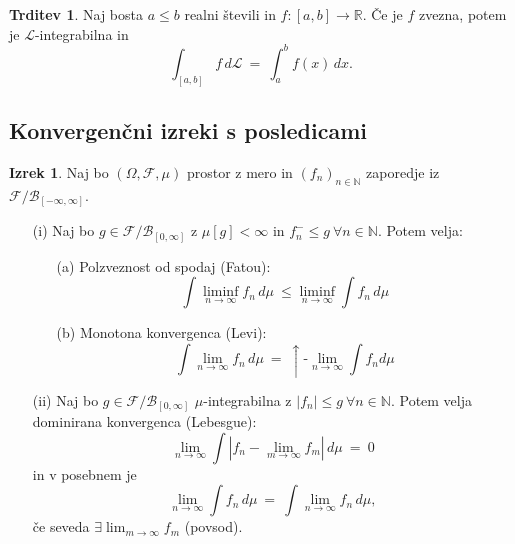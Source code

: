 \documentclass[11pt]{article}
\newcommand{\R}{\mathbb{R}}
\newcommand{\N}{\mathbb{N}}
\newcommand{\F}{\mathcal{F}}
\newcommand{\B}{\mathscr{B}}
\newcommand{\LL}{\mathscr{L}}
\newcommand{\1}{\mathbbm{1}}
\newcommand{\rr}{[-\infty,\infty]}
\theoremstyle{definition}
\theoremstyle{definition}
\newtheorem{trditev}{Trditev}[section]
\theoremstyle{definition}
\newtheorem{izrek}{Izrek}[section]
\theoremstyle{definition}
\begin{document}
\begin{trditev}

Naj bosta $a \leq b$ realni števili in $f: [a,b] \rightarrow \R$. Če je $f$ zvezna, potem je $\LL$-integrabilna in 
$$\int_{[a,b]} f \,d\LL ~=~ \int_a^b f(x)\,dx.$$

\end{trditev}
\vspace{0.5cm}


\subsection{Konvergenčni izreki s posledicami}
\vspace{0.5cm}

\begin{izrek}

Naj bo $(\Omega, \F,\mu)$ prostor z mero in $(f_n)_{n \in \N}$ zaporedje iz $\F/\B_{\rr}$.
\begin{itemize}

\item[(i)] Naj bo $g \in \F/\B_{[0,\infty]}$ z $\mu[g] < \infty$ in $f_n^- \leq g ~\forall n \in \N$. Potem velja:
\begin{itemize}
	\item[(a)] Polzveznost od spodaj (Fatou):
	$$\int \liminf_{n \rightarrow \infty} f_n \,d\mu ~\leq \liminf_{n \rightarrow \infty} \int f_n \,d\mu$$
	\item[(b)] Monotona konvergenca (Levi):
	$$\int \lim_{n \rightarrow \infty} f_n \,d\mu ~=~ \uparrow\text{-}\lim_{n \rightarrow \infty} \int f_n d\mu$$
\end{itemize}

\item[(ii)] Naj bo $g \in \F/\B_{[0,\infty]}$ $\mu$-integrabilna z $|f_n| \leq g ~\forall n \in \N$. Potem velja dominirana konvergenca (Lebesgue):
$$\lim_{n \rightarrow \infty} \int |f_n - \lim_{m \rightarrow \infty} f_m| \,d\mu ~=~ 0$$ 
in v posebnem je
$$\lim_{n \rightarrow \infty} \int f_n \,d\mu ~=~ \int \lim_{n \rightarrow \infty} f_n \,d\mu,$$
če seveda $\exists \lim_{m \rightarrow \infty} f_m$ (povsod).

\end{itemize}

\end{izrek}
\vspace{0.5cm}
\end{document}

